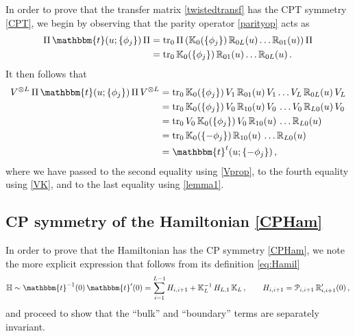 \documentclass[12pt]{article}
\numberwithin{equation}{section}
\begin{document}
	In order to prove that the transfer matrix \eqref{twistedtransf} has
	the CPT symmetry \eqref{CPT}, we begin by observing that the parity operator \eqref{parityop} acts as
	\begin{align}
		\Pi\, \mathbbm{t}(u; \{\phi_j \})\, \Pi &= \mathrm{tr}_{0}\, \Pi \left(\mathbb{K}_0(\{\phi_j \})\, \mathbb{R}_{0L}(u)\dots \mathbb{R}_{01}(u) \right) \Pi \nonumber\\
		& = \mathrm{tr}_{0}\, \mathbb{K}_0(\{\phi_j \})\, \mathbb{R}_{01}(u)\dots \mathbb{R}_{0L}(u) \,.
	\end{align}
	It then follows that
	\begin{align}
		V^{\otimes L}\, \Pi\, \mathbbm{t}(u; \{\phi_j \})\, \Pi\, V^{\otimes L} &= \mathrm{tr}_{0}\, \mathbb{K}_0(\{\phi_j \})\, V_1\, \mathbb{R}_{01}(u)\, V_1 \dots V_L\, \mathbb{R}_{0L}(u) \, V_L \nonumber \\
		&= \mathrm{tr}_{0}\,  \mathbb{K}_0(\{\phi_j \})\, V_0\, \mathbb{R}_{10}(u)\, V_0\, \dots  V_0\, \mathbb{R}_{L0}(u)\, V_0 \nonumber \\
		&= \mathrm{tr}_{0}\, V_0\, \mathbb{K}_0(\{\phi_j \})\, V_0\, \mathbb{R}_{10}(u)\,  \dots  \mathbb{R}_{L0}(u) \nonumber \\
		&= \mathrm{tr}_{0}\, \mathbb{K}_0(\{-\phi_j \})\, \mathbb{R}_{10}(u)\,  \dots  \mathbb{R}_{L0}(u) \nonumber \\
		&= \mathbbm{t}^t(u; \{-\phi_j \}) \,,
		\label{CPTproof}
	\end{align}
	where we have passed to the second equality using \eqref{Vprop}, to the fourth equality using \eqref{VK}, and to the last equality using \eqref{lemma1}. 
	
	\subsection{CP symmetry of the Hamiltonian \eqref{CPHam}}
	
	In order to prove that the Hamiltonian has the CP symmetry \eqref{CPHam}, we note the more explicit expression that follows from its definition \eqref{eq:Hamil} 
	\begin{equation}
		\mathbb{H} \sim \mathbbm{t}^{-1}(0)\, \mathbbm{t}'(0) = \sum_{i=1}^{L-1} H_{i,i+1} +  \mathbb{K}^{-1}_L\, H_{L,1}\, \mathbb{K}_L \,, \qquad H_{i,i+1} = \mathcal{P}_{i,i+1}\, \mathbb{R}'_{i,i+1}(0) \,,
		\label{Hamexpl}
	\end{equation}
	and proceed to show that the ``bulk'' and ``boundary'' terms are separately invariant.
	
\end{document}
